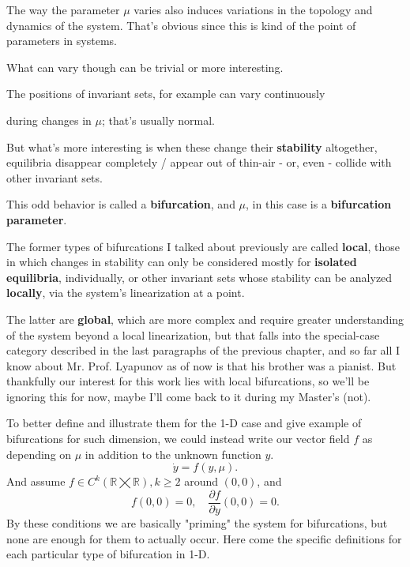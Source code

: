 The way the parameter $\mu$ varies also induces variations in the topology and dynamics of the system. That's obvious since this is kind of the point of parameters in systems.

What can vary though can be trivial or more interesting.

The positions of invariant sets, for example can vary continuously

during changes in $\mu$; that's usually normal.

But what's more interesting is when these change their \textbf{stability} altogether, equilibria disappear completely / appear out of thin-air - or, even - collide with other invariant sets.

This odd behavior is called a \textbf{bifurcation}, and $\mu$, in this case is a \textbf{bifurcation parameter}.

The former types of bifurcations I talked about previously are called \textbf{local}, those in which changes in stability can only be considered mostly for \textbf{isolated equilibria}, individually, or other invariant sets whose stability can be analyzed \textbf{locally}, via the system's linearization at a point.

The latter are \textbf{global}, which are more complex and require greater understanding of the system beyond a local linearization, but that falls into the special-case category described in the last paragraphs of the previous chapter, and so far all I know about Mr. Prof. Lyapunov as of now is that his brother was a pianist. But thankfully our interest for this work lies with local bifurcations, so we'll be ignoring this for now, maybe I'll come back to it during my Master's (not).

To better define and illustrate them for the 1-D case and give example of bifurcations for such dimension, we could instead write our vector field $f$ as depending on $\mu$ in addition to the unknown function $y$.
\begin{equation}\label{eq:1-d_bif_sys}
	\dot{y} = f(y, \mu).
\end{equation}
And assume $f \in C^k(\mathbb{R} \bigtimes \mathbb{R}), k \geq 2 $ around $(0,0)$, and
\begin{equation}\label{bifurcation_priming}
	f(0,0) = 0, \quad \frac{\partial f}{\partial y}(0,0) = 0.
\end{equation}
By these conditions we are basically "priming" the system for bifurcations, but none are enough for them to actually occur. Here come the specific definitions for each particular type of bifurcation in 1-D.

